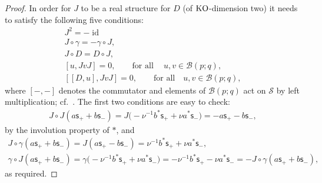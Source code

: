 \documentclass[10pt,a4paper]{amsart}
\numberwithin{equation}{section}
\def\Weyl#1#2{{\mathcal{B}}(#1;#2)}
\begin{document}
\begin{proof}
In order for $J$ to be a real structure for $D$ (of ${\rm KO}$-dimension two) it needs to satisfy the following f\/ive conditions:
\begin{subequations}\label{real}
\begin{gather}
J^2 = -\operatorname{id} \label{j2}
\\
J\circ\gamma = - \gamma\circ J, \label{jgamma}
\\
J\circ D = D\circ J, \label{jd}
\\
[u, J vJ] = 0, \qquad \mbox{for all}\ \quad u,v\in \Weyl p q, \label{order-0}
\\
[[D,u], J vJ] = 0, \qquad \mbox{for all} \quad u,v\in \Weyl p q, \label{order-1}
\end{gather}
\end{subequations}
where $[-,-]$ denotes the commutator and elements of $\Weyl p q$ act on $\mathcal{S}$ by left multiplication; cf.~\cite{Con:rea}. The f\/irst two conditions are easy to check:
\begin{gather*}
J\circ J(a{\mathsf{s}}_++b{\mathsf{s}}_-) = J\big({-}\nu^{-1} b^*{\mathsf{s}}_+ + \nu a^*{\mathsf{s}}_-\big) = - a {\mathsf{s}}_+-b{\mathsf{s}}_-,
\end{gather*}
by the involution property of $*$, and
\begin{gather*}
J\circ \gamma (a{\mathsf{s}}_++b{\mathsf{s}}_-) = J(a{\mathsf{s}}_+-b{\mathsf{s}}_-) =\nu^{-1} b^*{\mathsf{s}}_+ + \nu a^*{\mathsf{s}}_-,
\\
\gamma\circ J (a{\mathsf{s}}_++b{\mathsf{s}}_-) = \gamma\big({-}\nu^{-1} b^*{\mathsf{s}}_+ + \nu a^*{\mathsf{s}}_-\big) = -\nu^{-1} b^*{\mathsf{s}}_+ - \nu a^*{\mathsf{s}}_- = -J\circ \gamma (a {\mathsf{s}}_++b{\mathsf{s}}_-) ,
\end{gather*}
as required.


\end{proof}
\end{document}
